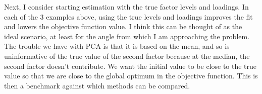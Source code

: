 \documentclass[12pt]{article}
\begin{document}
\clearpage

Next, I consider starting estimation with the true factor levels and loadings. In each of the 3 examples above, using the true levels and loadings improves the fit and lowers the objective function value. I think this can be thought of as the ideal scenario, at least for the angle from which I am approaching the problem. The trouble we have with PCA is that it is based on the mean, and so is uninformative of the true value of the second factor because at the median, the second factor doesn't contribute. We want the initial value to be close to the true value so that we are close to the global optimum in the objective function. This is then a benchmark against which methods can be compared.

\pagebreak \newpage
\singlespacing

%

\end{document}

